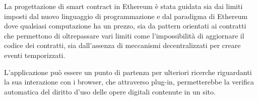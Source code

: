 \documentclass[11pt,oneside,a4paper]{article}
\begin{document}
	 
	\iffalse	
	Questo progetto mi ha permesso di approfondire il funzionamento dei sistemi Ethereum e Bitcoin, sviscerare le applicazioni della crittografia negli algoritmi di consenso, nella firma e cifratura, la vasta moltitudine di applicazioni basate su blockchain, nonché le alternative a questa tecnologia. Mi ha dato a possibilità inoltre di sperimentare vari framework reattivi per lo sviluppo di applicazioni frontend.
	\fi
	
	La progettazione di smart contract in Ethereum è stata guidata sia dai limiti imposti dal nuovo linguaggio di programmazione e dal paradigma di Ethereum dove qualsiasi computazione ha un prezzo, sia da pattern orientati ai contratti che permettono di oltrepassare vari limiti come l'impossibilità di aggiornare il codice dei contratti, sia dall'assenza di meccanismi decentralizzati per creare eventi temporizzati.
	
	L'applicazione può essere un punto di partenza per ulteriori ricerche riguardanti la sua interazione con i browser, che attraverso plug-in, permetterebbe la verifica automatica del diritto d'uso delle opere digitali contenute in un sito.

	\iffalse
	\begin{enumerate}
		\item L'oggetto della tesi
		\item Lo scopo
		\item Progetti simili
		\item cosa aggiunge
		\item cos'è la blockchain
		\item L'innovazione di ethereum
		\item Cos'è ethereum
		\item Come lo usiamo
		\item Cosa usiamo Solidity 
		\item Nuovo paradigma pattern
		\item Sviluppi futuri
	\end{enumerate}

	
	
	\fi
\end{document}

